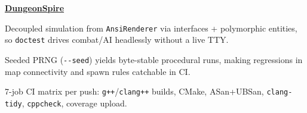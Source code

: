 \begin{twocolentry}{}
\href{https://github.com/faketut/DungeonSpire}{\textbf{DungeonSpire}}
\end{twocolentry}
\begin{onecolentry}
\begin{highlights}
\item Decoupled simulation from \texttt{AnsiRenderer} via interfaces + polymorphic entities, so \texttt{doctest} drives combat/AI headlessly without a live TTY.
\item Seeded PRNG (\texttt{-{}-seed}) yields byte-stable procedural runs, making regressions in map connectivity and spawn rules catchable in CI.
\item 7-job CI matrix per push: \texttt{g++}/\texttt{clang++} builds, CMake, ASan+UBSan, \texttt{clang-tidy}, \texttt{cppcheck}, coverage upload.
\end{highlights}
\end{onecolentry}
